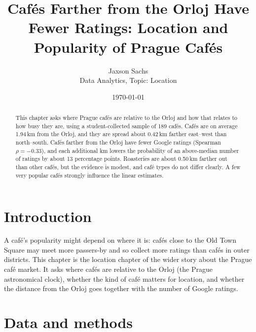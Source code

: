 \documentclass[11pt,a4paper]{article}
\title{\textbf{Caf\'es Farther from the Orloj Have Fewer Ratings: Location and Popularity of Prague Caf\'es}}
\author{Jaxson Sachs\\[0.3ex]\small Data Analytics, Topic: Location}
\date{\today}
\begin{document}
\maketitle

\begin{abstract}
\noindent This chapter asks where Prague caf\'es are relative to the Orloj and how that relates to how busy they are, using a student-collected sample of 189 caf\'es. Caf\'es are on average 1.94\,km from the Orloj, and they are spread about 0.42\,km farther east--west than north--south. Caf\'es farther from the Orloj have fewer Google ratings (Spearman $\rho = -0.33$), and each additional km lowers the probability of an above-median number of ratings by about 13 percentage points. Roasteries are about 0.50\,km farther out than other caf\'es, but the evidence is modest, and caf\'e types do not differ clearly. A few very popular caf\'es strongly influence the linear estimates.
\end{abstract}

\section{Introduction}
A caf\'e's popularity might depend on where it is: caf\'es close to the Old Town Square may meet more passers-by and so collect more ratings than caf\'es in outer districts. This chapter is the location chapter of the wider story about the Prague caf\'e market. It asks where caf\'es are relative to the Orloj (the Prague astronomical clock), whether the kind of caf\'e matters for location, and whether the distance from the Orloj goes together with the number of Google ratings.

\section{Data and methods}
\end{document}

